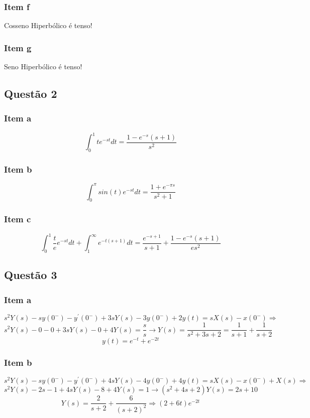 \documentclass[a4paper, 12pt]{article}
\begin{document}
    \subsubsection{Item f} 
    Cosseno Hiperbólico é tenso!
    \subsubsection{Item g}
    Seno Hiperbólico é tenso! 
    \subsection{Quest\~{a}o 2}
    \subsubsection{Item a} 
    \[\int_{0}^{1} te^{-st}dt = \frac{1-e^{-s}(s+1)}{s^{2}}\]    
    \subsubsection{Item b} 
    \[\int_{0}^{\pi} sin(t)e^{-st}dt = \frac{1+e^{-\pi s}}{s^{2}+1}\]    
    \subsubsection{Item c}    
	\[\int_{0}^{1} \frac{t}{e}e^{-st}dt + \int_{1}^{\infty} e^{-t(s+1)}dt = \frac{e^{-s+1 }}{s+1} + \frac{1-e^{-s}(s+1)}{es^{2}}\]         
    \subsection{Quest\~{a}o 3}
    \subsubsection{Item a} 
    \[s^{2}Y(s) - sy(0^{-}) - y^{'}(0^{-}) + 3sY(s) - 3y(0^{-}) +2y(t) = sX(s) - x(0^{-}) \Rightarrow\]  
    \[s^{2}Y(s) - 0 - 0 + 3sY(s) - 0 +4Y(s) = \frac{s}{s} \rightarrow Y(s) = \frac{1}{s^{2} + 3s + 2} = \frac{1}{s+1} + \frac{1}{s+2}\]      
    \[y(t) = e^{-t} + e^{-2t}\]     
    \subsubsection{Item b} 
    \[s^{2}Y(s) - sy(0^{-}) - y^{'}(0^{-}) + 4sY(s) - 4y(0^{-}) +4y(t) = sX(s) - x(0^{-}) + X(s) \Rightarrow\]  
    \[s^{2}Y(s) - 2s - 1 + 4sY(s) -8 +4Y(s) = 1\rightarrow (s^{2} + 4s +2)Y(s) = 2s +10\]      
    \[Y(s) = \frac{2}{s+2} + \frac{6}{(s+2)^2} \Rightarrow (2+6t)e^{-2t}\]         
\end{document}

